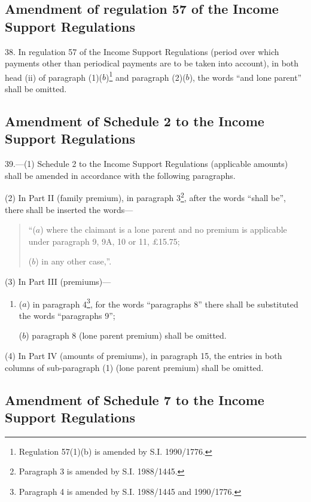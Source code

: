 \documentclass[12pt,a4paper]{article}
\begin{document}
\subsection[38. Amendment of regulation 57 of the Income Support Regulations]{Amendment of regulation 57 of the Income Support Regulations}

38.  In regulation 57 of the Income Support Regulations (period over which payments other than periodical payments are to be taken into account), in both head (ii) of paragraph (1)($b$)\footnote{\frenchspacing Regulation 57(1)(b) is amended by S.I. 1990/1776.} and paragraph (2)($b$), the words “and lone parent” shall be omitted.

\subsection[39. Amendment of Schedule 2 to the Income Support Regulations]{Amendment of Schedule 2 to the Income Support Regulations}

\begin{sloppypar}
39.—(1) Schedule 2 to the Income Support Regulations (applicable amounts) shall be amended in accordance with the following paragraphs.
\end{sloppypar}

(2) In Part II (family premium), in paragraph 3\footnote{\frenchspacing Paragraph 3 is amended by S.I. 1988/1445.}, after the words “shall be”, there shall be inserted the words—
\begin{quotation}
“($a$) where the claimant is a lone parent and no premium is applicable under paragraph 9, 9A, 10 or 11, £15.75;

($b$) in any other case,”.
\end{quotation}

(3) In Part III (premiums)—
\begin{enumerate}\item[]
($a$) in paragraph 4\footnote{\frenchspacing Paragraph 4 is amended by S.I. 1988/1445 and 1990/1776.}, for the words “paragraphs 8” there shall be substituted the words “paragraphs 9”;

($b$) paragraph 8 (lone parent premium) shall be omitted.
\end{enumerate}

(4) In Part IV (amounts of premiums), in paragraph 15, the entries in both columns of sub-paragraph (1) (lone parent premium) shall be omitted.

\subsection[40. Amendment of Schedule 7 to the Income Support Regulations]{Amendment of Schedule 7 to the Income Support Regulations}
\end{document}
